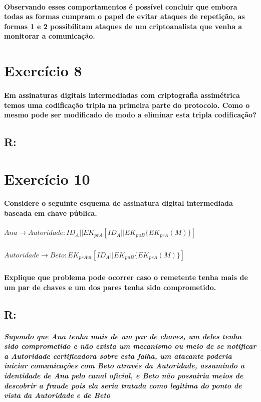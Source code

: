 \documentclass[10pt,a4paper]{report}
\begin{document}
\paragraph{Observando esses comportamentos é possível concluir que embora todas as formas cumpram o papel de evitar ataques de repetição, as formas 1 e 2 possibilitam ataques de um criptoanalista que venha a monitorar a comunicação.}


\section*{Exercício 8}
\paragraph{ Em assinaturas digitais intermediadas com criptografia assimétrica temos uma codificação tripla na primeira parte do protocolo. Como o mesmo pode ser modificado de modo a eliminar esta tripla codificação?}
\subsection*{R:}

\section*{Exercício 10}
\paragraph{ Considere o seguinte esquema de assinatura digital intermediada baseada em chave pública.}
\subparagraph{$Ana \rightarrow Autoridade: ID_A || EK_{prA} [ ID_A || EK_{puB} \{ EK_{prA} ( M ) \} ]$ }
\subparagraph{$Autoridade \rightarrow Beto: EK_{prAut} [ ID_A || EK_{puB} \{ EK_{prA} ( M )\} ]$ }
\paragraph{Explique que problema pode ocorrer caso o remetente tenha mais de um par de chaves e um dos pares tenha sido comprometido.}
\subsection*{R:}
\subparagraph{Supondo que Ana tenha mais de um par de chaves, um deles tenha sido comprometido e não exista um mecanismo ou meio de se notificar a Autoridade certificadora sobre esta falha, um atacante poderia iniciar comunicações com Beto através da Autoridade, assumindo a identidade de Ana pelo canal oficial, e Beto não possuiria meios de descobrir a fraude pois ela seria tratada como legitima do ponto de vista da Autoridade e de Beto}
\end{document}
